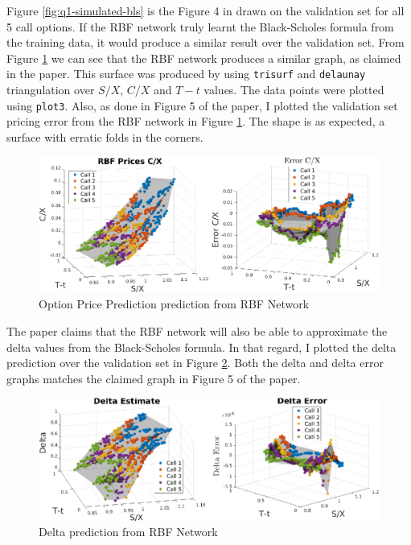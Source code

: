 \documentclass[11pt, fleqn]{article}
\begin{document}
Figure \ref{fig:q1-simulated-bls} is the Figure 4 in \cite{hutchinson} drawn on the validation set for all 5 call options. If the RBF network truly learnt the Black-Scholes formula from the training data, it would produce a similar result over the validation set. From Figure \ref{fig:q1-rbf-price} we can see that the RBF network produces a similar graph, as claimed in the paper. This surface was produced by using \texttt{trisurf} and \texttt{delaunay} triangulation over $S/X$, $C/X$ and $T-t$ values. The data points were plotted using \texttt{plot3}. Also, as done in Figure 5 of the paper, I plotted the validation set pricing error from the RBF network in Figure \ref{fig:q1-rbf-price}. The shape is as expected, a surface with erratic folds in the corners.\\

\begin{figure}[!h]
\begin{center}
	\includegraphics[scale=.6] {q1_rbf_price.eps}
	\caption{Option Price Prediction prediction from RBF Network}
	\label{fig:q1-rbf-price}
\end{center}
\end{figure}

The paper claims that the RBF network will also be able to approximate the delta values from the Black-Scholes formula. In that regard, I plotted the delta prediction over the validation set in Figure \ref{fig:q1-rbf-delta}. Both the delta and delta error graphs matches the claimed graph in Figure 5 of the paper.\\

\begin{figure}[!h]
\begin{center}
	\includegraphics[scale=.6] {q1_rbf_delta.eps}
	\caption{Delta prediction from RBF Network}
	\label{fig:q1-rbf-delta}
\end{center}
\end{figure}
\end{document}
